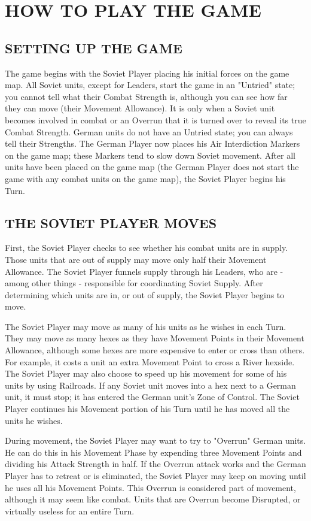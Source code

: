 \section{HOW TO PLAY THE GAME}

\subsection{SETTING UP THE GAME}

The game begins with the Soviet Player placing his initial forces on the game map. All Soviet units, except for Leaders, start the game in an "Untried" state; you cannot tell what their Combat Strength is, although you can see how far they can move (their Movement Allowance). It is only when a Soviet unit becomes involved in combat or an Overrun that it is turned over to reveal its true Combat Strength. German units do not have an Untried state; you can always tell their Strengths. The German Player now places his Air Interdiction Markers on the game map; these Markers tend to slow down Soviet movement. After all units have been placed on the game map (the German Player does not start the game with any combat units on the game map), the Soviet Player begins his Turn.

\subsection{THE SOVIET PLAYER MOVES}

First, the Soviet Player checks to see whether his combat units are in supply. Those units that are out of supply may move only half their Movement Allowance. The Soviet Player funnels supply through his Leaders, who are - among other things - responsible for coordinating Soviet Supply. After determining which units are in, or out of supply, the Soviet Player begins to move.

The Soviet Player may move as many of his units as he wishes in each Turn. They may move as many hexes as they have Movement Points in their Movement Allowance, although some hexes are more expensive to enter or cross than others. For example, it costs a unit an extra Movement Point to cross a River hexside. The Soviet Player may also choose to speed up his movement for some of his units by using Railroads. If any Soviet unit moves into a hex next to a German unit, it must stop; it has entered the German unit's Zone of Control. The Soviet Player continues his Movement portion of his Turn until he has moved all the units he wishes.

During movement, the Soviet Player may want to try to "Overrun" German units. He can do this in his Movement Phase by expending three Movement Points and dividing his Attack Strength in half. If the Overrun attack works and the German Player has to retreat or is eliminated, the Soviet Player may keep on moving until he uses all his Movement Points. This Overrun is considered part of movement, although it may seem like combat. Units that are Overrun become Disrupted, or virtually useless for an entire Turn.